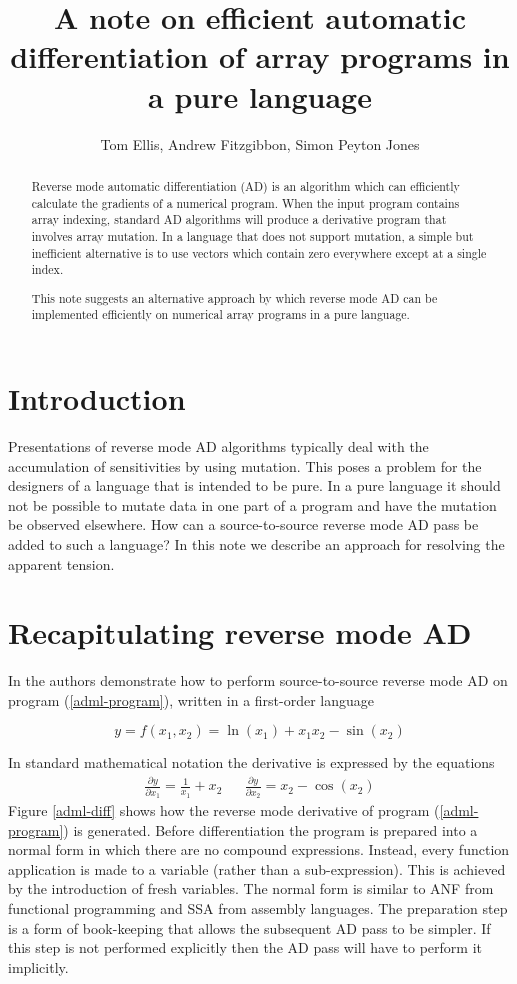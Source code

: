 \documentclass[12pt]{article}
\title{A note on efficient automatic differentiation of array programs
  in a pure language}
\author{Tom Ellis, Andrew Fitzgibbon, Simon Peyton Jones}
\begin{document}
\maketitle

\begin{abstract}
Reverse mode automatic differentiation (AD) is an algorithm which can
efficiently calculate the gradients of a numerical program.  When the
input program contains array indexing, standard AD algorithms will
produce a derivative program that involves array mutation.  In a
language that does not support mutation, a simple but inefficient
alternative is to use vectors which contain zero everywhere except at
a single index.

This note suggests an alternative approach by which reverse mode AD
can be implemented efficiently on numerical array programs in a pure
language.
\end{abstract}

\section{Introduction}

Presentations of reverse mode AD algorithms typically deal with the
accumulation of sensitivities by using mutation.  This poses a problem
for the designers of a language that is intended to be pure.  In a
pure language it should not be possible to mutate data in one part of
a program and have the mutation be observed elsewhere.  How can a
source-to-source reverse mode AD pass be added to such a language?  In
this note we describe an approach for resolving the apparent tension.

\section{Recapitulating reverse mode AD}

In \cite{adml} the authors demonstrate how to perform source-to-source
reverse mode AD on program (\ref{adml-program}), written in a
first-order language

\begin{equation}
\label {adml-program}
y = f(x_1, x_2) = \ln(x_1)+x_1 x_2-\sin(x_2)
\end{equation}

In standard mathematical notation the derivative is expressed by the
equations
\begin{align*}
\frac{\partial y}{\partial x_1} = \frac{1}{x_1} + x_2
&&
\frac{\partial y}{\partial x_2} = x_2 - \cos(x_2)
\end{align*}
Figure \ref{adml-diff} shows how the reverse mode derivative of
program (\ref{adml-program}) is generated.  Before differentiation the
program is prepared into a normal form in which there are no compound
expressions. Instead, every function application is made to a variable
(rather than a sub-expression).  This is achieved by the introduction
of fresh variables.  The normal form is similar to ANF from functional
programming and SSA from assembly languages.  The preparation step is
a form of book-keeping that allows the subsequent AD pass to be
simpler.  If this step is not performed explicitly then the AD pass
will have to perform it implicitly.
\end{document}
